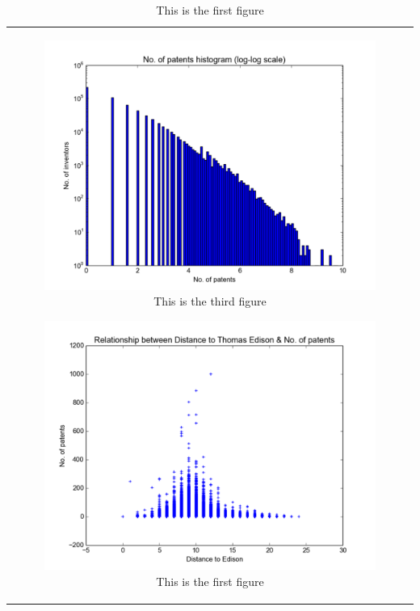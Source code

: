 
\begin{table}[h] 
  \begin{tabular}{@{}c@{}} 
   \begin{minipage}{0.45\linewidth}
      \begin{figure}[H]
          \includegraphics[scale=0.425]{../figures/patent.pdf}
          \caption{This is the third figure}
      \end{figure}
  \end{minipage}
  \begin{minipage}{0.45\linewidth}
      \begin{figure}[H]
          \includegraphics[scale=0.425]{../figures/distance_patent.pdf}
          \caption{This is the first figure}
      \end{figure}
  \end{minipage}
  \end{tabular}
\end{table}


